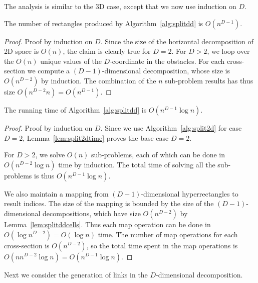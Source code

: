 \documentclass[english,gradu]{tktltiki2018}
\begin{document}
The analysis is similar to the 3D case, except that we now use induction on $D$.

\begin{lem}\label{lem:splitddcells}The number of rectangles produced by Algorithm~\ref{alg:splitdd} is $O(n^{D-1})$.\end{lem}
\begin{proof}
Proof by induction on $D$.
Since the size of the horizontal decomposition of 2D space is $O(n)$, the claim is clearly true for $D=2$.
For $D>2$, we loop over the $O(n)$ unique values of the $D$-coordinate in the obstacles.
For each cross-section we compute a $(D-1)$-dimensional decomposition, whose size is $O(n^{D-2})$ by induction.
The combination of the $n$ sub-problem results has thus size $O(n^{D-2}n)=O(n^{D-1})$.
\end{proof}

\begin{lem}\label{lem:splitddtime}The running time of Algorithm~\ref{alg:splitdd} is $O(n^{D-1}\log n)$.\end{lem}
\begin{proof}
Proof by induction on $D$.
Since we use Algorithm~\ref{alg:split2d} for case $D=2$, Lemma~\ref{lem:split2dtime} proves the base case $D=2$.

For $D>2$, we solve $O(n)$ sub-problems, each of which can be done in $O(n^{D-2}\log n)$ time by induction.
The total time of solving all the sub-problems is thus $O(n^{D-1}\log n)$.

We also maintain a mapping from $(D-1)$-dimensional hyperrectangles to result indices.
The size of the mapping is bounded by the size of the $(D-1)$-dimensional decompositions, which have size $O(n^{D-2})$ by Lemma~\ref{lem:splitddcells}.
Thus each map operation can be done in $O(\log{n^{D-2}})=O(\log n)$ time.
The number of map operations for each cross-section is $O(n^{D-2})$, so the total time spent in the map operations is $O(nn^{D-2}\log n)=O(n^{D-1}\log n)$.
\end{proof}

Next we consider the generation of links in the $D$-dimensional decomposition.
\end{document}
